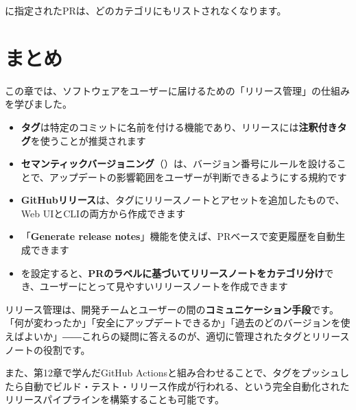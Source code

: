  に指定されたPRは、どのカテゴリにもリストされなくなります。

\section{まとめ}

この章では、ソフトウェアをユーザーに届けるための「リリース管理」の仕組みを学びました。

\begin{itemize}
  \item \textbf{タグ}は特定のコミットに名前を付ける機能であり、リリースには\textbf{注釈付きタグ}を使うことが推奨されます
  \item \textbf{セマンティックバージョニング}（）は、バージョン番号にルールを設けることで、アップデートの影響範囲をユーザーが判断できるようにする規約です
  \item \textbf{GitHubリリース}は、タグにリリースノートとアセットを追加したもので、Web UIとCLIの両方から作成できます
  \item 「\textbf{Generate release notes}」機能を使えば、PRベースで変更履歴を自動生成できます
  \item {} を設定すると、\textbf{PRのラベルに基づいてリリースノートをカテゴリ分け}でき、ユーザーにとって見やすいリリースノートを作成できます
\end{itemize}

リリース管理は、開発チームとユーザーの間の\textbf{コミュニケーション手段}です。「何が変わったか」「安全にアップデートできるか」「過去のどのバージョンを使えばよいか」――これらの疑問に答えるのが、適切に管理されたタグとリリースノートの役割です。

また、第12章で学んだGitHub Actionsと組み合わせることで、タグをプッシュしたら自動でビルド・テスト・リリース作成が行われる、という完全自動化されたリリースパイプラインを構築することも可能です。

